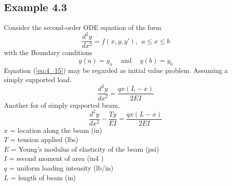 \documentclass[12pt]{report}
\newcommand{\refn}[1]{(\ref{#1})}
\newcommand{\refx}[1]{\refn{eq:#1}}
\newcommand{\sprime}{'}
\begin{document}
	\subsection*{Example 4.3}
	Consider the second-order ODE equation of the form
	\begin{equation}
		\frac{d^2y}{dx^2} = f(x,y,y\sprime), ~~ a \leq x \leq b \label{eq:4_15}
	\end{equation}
	with the Boundary conditions
	\begin{equation*}
		y(a) = y_a ~~~~\text{ and } ~~~~ y(b) = y_b
	\end{equation*}
	Equation \refx{4_15} may be regarded as initial value problem. Assuming a simply supported load.
	\begin{equation}
		\frac{d^2y}{dx^2} = \frac{qx(L-x)}{2EI}\label{eq:4_16}
	\end{equation}
	Another for of simply supported beam,
	\begin{equation}
		\frac{d^2y}{dx^2} - \frac{Ty}{EI} = \frac{qx(L-x)}{2EI} \label{eq:4_17}
	\end{equation}
	$x$ = location along the beam (in)\\
	$T$ = tension applied (lbs)\\
	$E$ = Young’s modulus of elasticity of the beam (psi)\\
	$I$ = second moment of area (in4 )\\
	$q$ = uniform loading intensity (lb/in)\\
	$L$ = length of beam (in)
	
\end{document}
